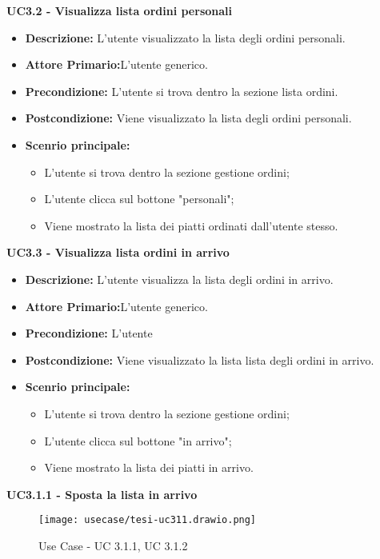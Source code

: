 \textbf{UC3.2 - Visualizza lista ordini personali}
\begin{itemize}
    \item \textbf{Descrizione:} L'utente visualizzato la lista degli ordini personali.
    \item \textbf{Attore Primario:}L'utente generico.
    \item \textbf{Precondizione:} L'utente si trova dentro la sezione lista ordini.
    \item \textbf{Postcondizione:} Viene visualizzato la lista degli ordini personali.
    \item \textbf{Scenrio principale:}
    \begin{itemize}
        \item L'utente si trova dentro la sezione gestione ordini;
        \item L'utente clicca sul bottone "personali";
        \item Viene mostrato la lista dei piatti ordinati dall'utente stesso.
    \end{itemize}
\end{itemize}
\textbf{UC3.3 - Visualizza lista ordini in arrivo}
\begin{itemize}
    \item \textbf{Descrizione:} L'utente visualizza la lista degli ordini in arrivo.
    \item \textbf{Attore Primario:}L'utente generico.
    \item \textbf{Precondizione:} L'utente 
    \item \textbf{Postcondizione:} Viene visualizzato la lista lista degli ordini in arrivo.
    \item \textbf{Scenrio principale:}
    \begin{itemize}
        \item L'utente si trova dentro la sezione gestione ordini;
        \item L'utente clicca sul bottone "in arrivo";
        \item Viene mostrato la lista dei piatti in arrivo.
    \end{itemize}
\end{itemize}
\textbf{UC3.1.1 - Sposta la lista in arrivo}
\begin{figure}[H]
    \centering
    \texttt{[image: usecase/tesi-uc311.drawio.png]}
    \caption{Use Case - UC 3.1.1, UC 3.1.2}
\end{figure}
